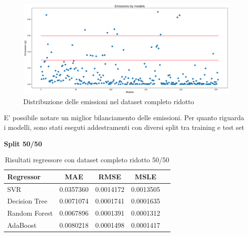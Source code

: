 \begin{figure}[H]
    \centering
    \includegraphics[scale=0.25]{images/nuova-situazione-ridotto.png}
    \caption{Distribuzione delle emissioni nel dataset completo ridotto}
\end{figure}

E' possibile notare un miglior bilanciamento delle emissioni. Per quanto riguarda i modelli, sono stati eseguti addestramenti con diversi split tra training e test set

\noindent\textbf{Split 50/50}


\begin{table}[H]
    \centering
    \begin{tabular}{|>{\centering\arraybackslash}m{5cm}|c|c|c|c|}
        \hline
        \textbf{Regressor} & \textbf{MAE} & \textbf{RMSE} & \textbf{MSLE} \\ [10pt]
        \hline
        SVR & 0.0357360 & 0.0014172 & 0.0013505 \\ [10pt]
        \hline
        Decision Tree & 0.0071074 & 0.0001741 & 0.0001635 \\ [10pt]
        \hline
        Random Forest & 0.0067896 & 0.0001391 & 0.0001312 \\ [10pt]
        \hline
        AdaBoost & 0.0080218 & 0.0001498 & 0.0001417 \\ [10pt]
        \hline
    \end{tabular}
    \caption{Risultati regressore con dataset completo ridotto 50/50}
    \label{tab:results}
\end{table}

